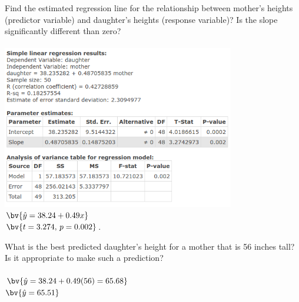 \documentclass{article}
\begin{document}
\begin{flushleft}
\begin{enumalpha}
\newpage
\item Find the estimated regression line for the relationship between mother's heights (predictor variable) and daughter's heights (response variable)? Is the slope significantly different than zero?\\
\medskip
{}\\
\medskip
\includegraphics[width=4in]{images/grp11_Q1_c}\\
$\bv{\hat y = 38.24 + 0.49 x}$\\
$\bv{t = 3.274, \, p = 0.002}$. 
\vspace{.5in}

\item What is the best predicted daughter's height for a mother that is 56 inches tall? Is it appropriate to make such a prediction?\\
\medskip
{}\\
$\bv{\hat y = 38.24 + 0.49 (56) = 65.68}$\\
$\bv{\hat y = 65.51}$\\
\medskip
{}


\end{enumalpha}



\newpage

\end{flushleft}
\end{document}
